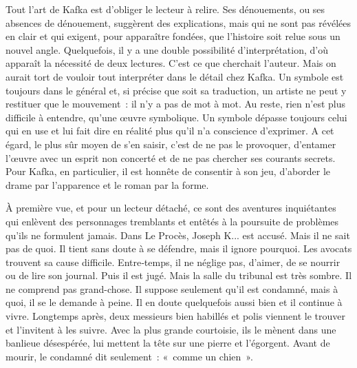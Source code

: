 \documentclass{book}
\begin{document}
Tout l'art de Kafka est d'obliger le lecteur à relire. Ses dénouements, ou ses absences de dénouement, suggèrent des explications, mais qui ne sont pas révélées en clair et qui exigent, pour apparaître fondées, que l'histoire soit relue sous un nouvel angle. Quelquefois, il y a une double possibilité d'interprétation, d'où apparaît la nécessité de deux lectures. C'est ce que cherchait l'auteur. Mais on aurait tort de vouloir tout interpréter dans le détail chez Kafka. Un symbole est toujours dans le général et, si précise que soit sa traduction, un artiste ne peut y restituer que le mouvement : il n'y a pas de mot à mot. Au reste, rien n'est plus difficile à entendre, qu'une œuvre symbolique. Un symbole dépasse toujours celui qui en use et lui fait dire en réalité plus qu'il n'a conscience d'exprimer. A cet égard, le plus sûr moyen de s'en saisir, c'est de ne pas le provoquer, d'entamer l'œuvre avec un esprit non concerté et de ne pas chercher ses courants secrets. Pour Kafka, en particulier, il est honnête de consentir à son jeu, d'aborder le drame par l'apparence et le roman par la forme.

À première vue, et pour un lecteur détaché, ce sont des aventures inquiétantes qui enlèvent des personnages tremblants et entêtés à la poursuite de problèmes qu'ils ne formulent jamais. Dans Le Procès, Joseph K... est accusé. Mais il ne sait pas de quoi. Il tient sans doute à se défendre, mais il ignore pourquoi. Les avocats trouvent sa cause difficile. Entre‑temps, il ne néglige pas, d'aimer, de se nourrir ou de lire son journal. Puis il est jugé. Mais la salle du tribunal est très sombre. Il ne comprend pas grand-chose. Il suppose seulement qu'il est condamné, mais à quoi, il se le demande à peine. Il en doute quelquefois aussi bien et il continue à vivre. Longtemps après, deux messieurs bien habillés et polis viennent le trouver et l'invitent à les suivre. Avec la plus grande courtoisie, ils le mènent dans une banlieue désespérée, lui mettent la tête sur une pierre et l'égorgent. Avant de mourir, le condamné dit seulement : « comme un chien ».
\end{document}
